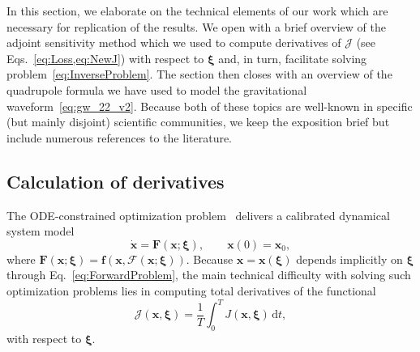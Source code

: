 \documentclass[ reprint,
nofootinbib,
 amsmath,amssymb,
 aps,
]{revtex4-2}
\begin{document}
In this section, we elaborate on the technical elements of our work which are necessary for replication of the results.
We open with a brief overview of the adjoint sensitivity method \cite{boltyanskiy1962mathematical} which we used to compute derivatives of $\mathcal{J}$ (see Eqs.~\cref{eq:Loss,eq:NewJ}) with respect to $\bm{\xi}$ and, in turn, facilitate solving problem~\cref{eq:InverseProblem}.
The section then closes with an overview of the quadrupole formula we have used to model the gravitational waveform~\cref{eq:gw_22_v2}.
Because both of these topics are well-known in specific (but mainly disjoint) scientific communities, we keep the exposition brief but include numerous references to the literature.

\subsection{Calculation of derivatives} \label{sub:implementation}

The ODE-constrained optimization problem~ delivers a calibrated dynamical system model
\begin{equation}
\label{eq:ForwardProblem}
	\dot{\mathbf{x}} = \mathbf{F}(\mathbf{x};{\bm{\xi}})
		,
	\qquad
	\mathbf{x}(0) = \mathbf{x}_0
	,
\end{equation}
where $\mathbf{F}(\mathbf{x};{\bm{\xi}}) = \mathbf{f}(\mathbf{x},\mathcal{F}(\mathbf{x};{\bm{\xi}}))$.
Because $\mathbf{x} = \mathbf{x}(\bm{\xi})$ depends implicitly on $\bm{\xi}$ through Eq.~\cref{eq:ForwardProblem}, the main technical difficulty with solving such optimization problems lies in computing total derivatives of the functional
\begin{equation}
\label{eq:AbstractFunctional}
	\mathcal{J}(\mathbf{x},\bm{\xi})
	=
	\frac{1}{T}
	\int_{0}^{T}
	J(\mathbf{x},{\bm{\xi}})
	\,
	\mathrm{d}t
	,
\end{equation}
with respect to $\bm{\xi}$.
\end{document}
